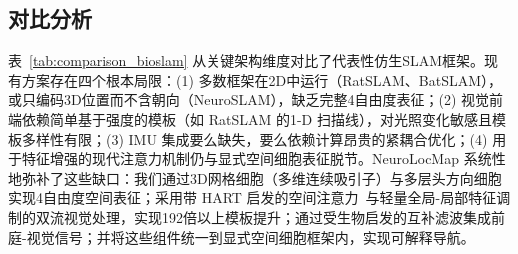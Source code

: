 \subsection{对比分析}
\label{sec:related_compare}

表~\ref{tab:comparison_bioslam} 从关键架构维度对比了代表性仿生SLAM框架。现有方案存在四个根本局限：(1) 多数框架在2D中运行（RatSLAM、BatSLAM），或只编码3D位置而不含朝向（NeuroSLAM），缺乏完整4自由度表征；(2) 视觉前端依赖简单基于强度的模板（如 RatSLAM 的1-D 扫描线），对光照变化敏感且模板多样性有限；(3) IMU 集成要么缺失，要么依赖计算昂贵的紧耦合优化；(4) 用于特征增强的现代注意力机制仍与显式空间细胞表征脱节。NeuroLocMap 系统性地弥补了这些缺口：我们通过3D网格细胞（多维连续吸引子）与多层头方向细胞实现4自由度空间表征；采用带 HART 启发的空间注意力~\cite{kosiorek2017hierarchical}与轻量全局-局部特征调制的双流视觉处理，实现192倍以上模板提升；通过受生物启发的互补滤波集成前庭-视觉信号；并将这些组件统一到显式空间细胞框架内，实现可解释导航。

